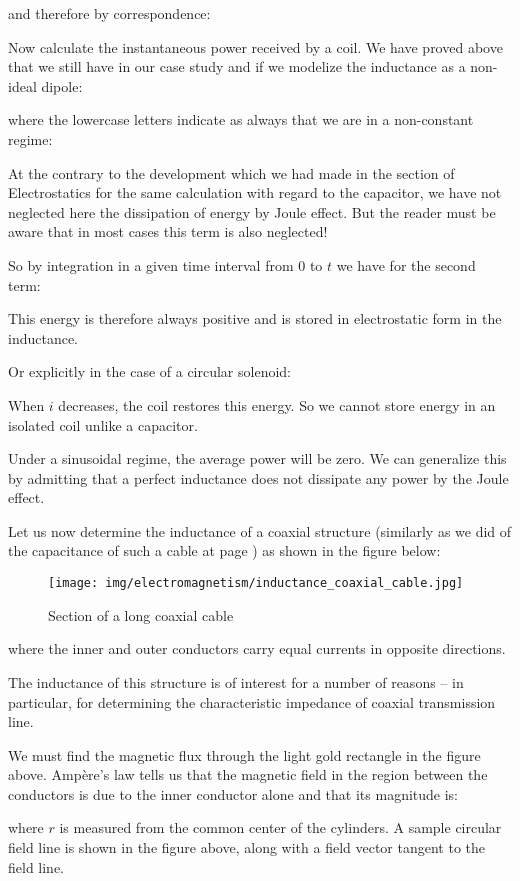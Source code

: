 	and therefore by correspondence:
	
	Now calculate the instantaneous power received by a coil. We have proved above that we still have in our case study and if we modelize the inductance as a non-ideal dipole:
	
	where the lowercase letters indicate as always that we are in a non-constant regime:
	
	At the contrary to the development which we had made in the section of Electrostatics for the same calculation with regard to the capacitor, we have not neglected here the dissipation of energy by Joule effect. But the reader must be aware that in most cases this term is also neglected!

	So by integration in a given time interval from $0$ to $t$ we have for the second term:
	
	This energy is therefore always positive and is stored in electrostatic form in the inductance.
	
	Or explicitly in the case of a circular solenoid:
	
	When $i$ decreases, the coil restores this energy. So we cannot store energy in an isolated coil unlike a capacitor.
	
	Under a sinusoidal regime, the average power will be zero. We can generalize this by admitting that a perfect inductance does not dissipate any power by the Joule effect.
	
	Let us now determine the inductance of a coaxial structure (similarly as we did of the capacitance of such a cable at page \pageref{capacitor}) as shown in the figure below:
	\begin{figure}[H]
		\centering
		\texttt{[image: img/electromagnetism/inductance\_coaxial\_cable.jpg]}
		\caption{Section of a long coaxial cable}
	\end{figure}
	where the inner and outer conductors carry equal currents in opposite directions.

 	The inductance of this structure is of interest for a number of reasons – in particular, for determining the characteristic impedance of coaxial transmission line.
 	
 	We must find the magnetic flux through the light gold rectangle in the figure above. Ampère’s law tells us that the magnetic field in the region between the conductors is due to the inner conductor alone and that its magnitude is:
 	
 	where $r$ is measured from the common center of the cylinders. A sample circular field line is shown in the figure above, along with a field vector tangent to the field line.
 	
